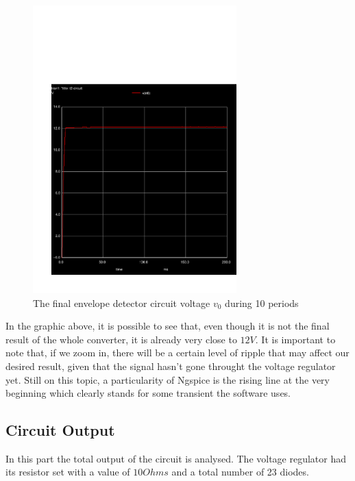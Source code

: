 \begin{figure}[H] \centering
\includegraphics[trim= 0cm 0cm 0cm 10cm, clip, width=0.7\textwidth]{trans1.pdf}
\caption{The final envelope detector circuit voltage $v_0$ during 10 periods}
\label{fig:sim_envelope}
\end{figure}


In the graphic above, it is possible to see that, even though it is not the final result of the whole converter, it is already very close to $12V$. It is important to note that, if we zoom in, there will be a certain level of ripple that may affect our desired result, given that the signal hasn't gone throught the voltage regulator yet. Still on this topic, a particularity of Ngspice is the rising line at the very beginning which clearly stands for some transient the software uses.

\subsection{Circuit Output}


In this part the total output of the circuit is analysed.
The voltage regulator had its resistor set with a value of $10 Ohms$ and a total number of 23 diodes.

